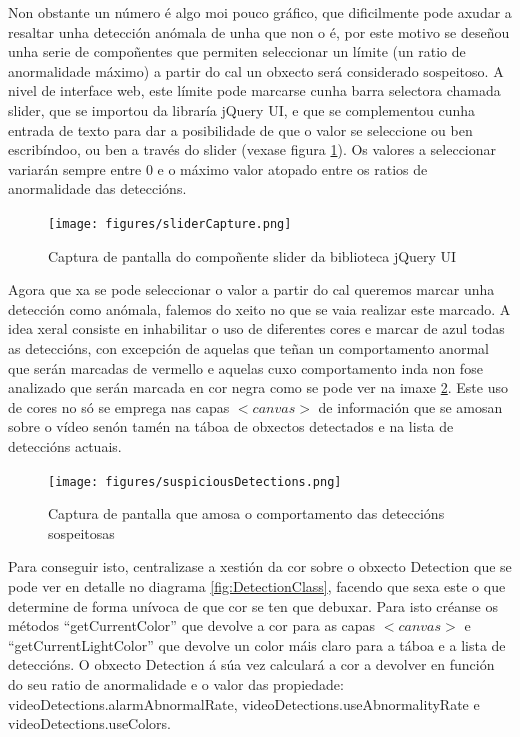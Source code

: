     Non obstante un número é algo moi pouco gráfico, que dificilmente pode axudar a resaltar unha 
    detección anómala de unha que non o é, por este motivo se deseñou unha serie de compoñentes que
    permiten seleccionar un límite (un ratio de anormalidade máximo) a partir do cal un obxecto será
    considerado sospeitoso. A nivel de interface web, este límite pode marcarse cunha barra 
    selectora chamada slider, que  se importou da libraría jQuery UI\cite{ComponenteSliderJqueryUi},
    e que se complementou cunha entrada de texto para dar a posibilidade de que o valor se seleccione
    ou ben escribíndoo, ou ben a través do slider (vexase figura \ref{fig:sliderCapture}).
    Os valores a seleccionar variarán sempre entre 0 e o máximo valor atopado entre os ratios de
    anormalidade das deteccións.

    \begin{figure}[htp]
    \begin{center}
        \texttt{[image: figures/sliderCapture.png]}
        \caption{Captura de pantalla do compoñente slider da biblioteca jQuery UI}
    \label{fig:sliderCapture}
    \end{center}
    \end{figure}
    
    Agora que xa se pode seleccionar o valor a partir do cal queremos marcar unha detección como
    anómala, falemos do xeito no que se vaia realizar este marcado. A idea xeral consiste en 
    inhabilitar o uso de diferentes cores e marcar de azul todas as deteccións, con excepción de 
    aquelas que teñan un comportamento anormal que serán marcadas de vermello e aquelas cuxo 
    comportamento inda non fose analizado que serán marcada en cor negra como se pode ver na imaxe
    \ref{fig:suspiciousDetections}. Este uso de cores no só
    se emprega nas capas $<canvas>$ de información que se amosan sobre o vídeo senón tamén na táboa
    de obxectos detectados e na lista de deteccións actuais.

    \begin{figure}[htp]
    \begin{center}
        \texttt{[image: figures/suspiciousDetections.png]}
        \caption{Captura de pantalla que amosa o comportamento das deteccións sospeitosas}
    \label{fig:suspiciousDetections}
    \end{center}
    \end{figure}
    
    Para conseguir isto, centralizase a xestión da cor sobre o obxecto Detection que se pode ver en
    detalle no diagrama \ref{fig:DetectionClass}, facendo que sexa 
    este o que determine de forma unívoca de que cor se ten que debuxar. Para isto créanse os 
    métodos ``getCurrentColor'' que devolve a cor para as capas $<canvas>$ e 
    ``getCurrentLightColor'' que devolve un color máis claro para a táboa e a lista de deteccións.
    O obxecto Detection á súa vez calculará a cor a devolver en función do seu ratio de anormalidade
    e o valor das propiedade: videoDetections.alarmAbnormalRate, videoDetections.useAbnormalityRate
    e videoDetections.useColors.
    
